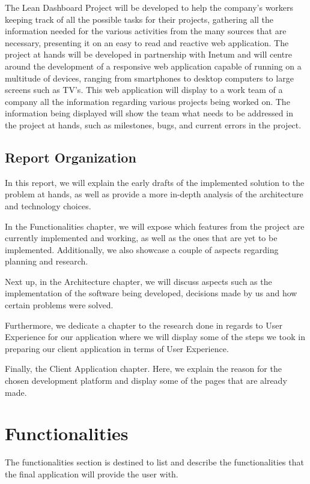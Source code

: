 \documentclass[a4paper,twoside,10pt]{report}
\begin{document}
The Lean Dashboard Project will be developed to help the company's workers keeping track of all the possible tasks for their projects, gathering all the information needed for the various activities from the many sources that are necessary, presenting it on an easy to read and reactive web application.
The project at hands will be developed in partnership with Inetum\cite{INETUM} and will centre around the development of a responsive web application capable of running on a multitude of devices, ranging from smartphones to desktop computers to large screens such as TV’s. This web application will display to a work team of a company all the information regarding various projects being worked on. 
The information being displayed will show the team what needs to be addressed in the project at hands, such as milestones, bugs, and current errors in the project.

\newpage
\section{Report Organization}
In this report, we will explain the early drafts of the implemented solution to the problem at hands, as well as provide a more in-depth analysis of the architecture and technology choices.

In the Functionalities chapter, we will expose which features from the project are currently implemented and working, as well as the ones that are yet to be implemented. Additionally, we also showcase a couple of aspects regarding planning and research.

Next up, in the Architecture chapter, we will discuss aspects such as the implementation of the software being developed, decisions made by us and how certain problems were solved.

Furthermore, we dedicate a chapter to the research done in regards to User Experience for our application where we will display some of the steps we took in preparing our client application in terms of User Experience.

Finally, the Client Application chapter. Here, we explain the reason for the chosen development platform and display some of the pages that are already made.  



\chapter{Functionalities}
The functionalities section is destined to list and describe the functionalities that the final application will provide the user with.
\end{document}

